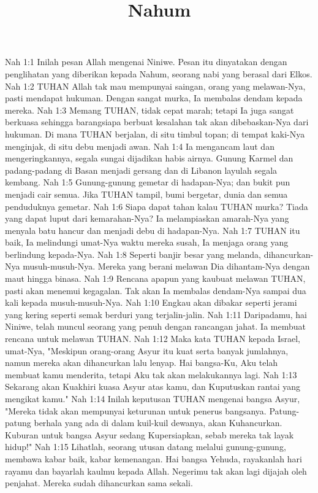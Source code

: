 

\title{Nahum}

Nah 1:1  Inilah pesan Allah mengenai Niniwe. Pesan itu dinyatakan dengan penglihatan yang diberikan kepada Nahum, seorang nabi yang berasal dari Elkos.
Nah 1:2  TUHAN Allah tak mau mempunyai saingan, orang yang melawan-Nya, pasti mendapat hukuman. Dengan sangat murka, Ia membalas dendam kepada mereka.
Nah 1:3  Memang TUHAN, tidak cepat marah; tetapi Ia juga sangat berkuasa sehingga barangsiapa berbuat kesalahan tak akan dibebaskan-Nya dari hukuman. Di mana TUHAN berjalan, di situ timbul topan; di tempat kaki-Nya menginjak, di situ debu menjadi awan.
Nah 1:4  Ia mengancam laut dan mengeringkannya, segala sungai dijadikan habis airnya. Gunung Karmel dan padang-padang di Basan menjadi gersang dan di Libanon layulah segala kembang.
Nah 1:5  Gunung-gunung gemetar di hadapan-Nya; dan bukit pun menjadi cair semua. Jika TUHAN tampil, bumi bergetar, dunia dan semua penduduknya gemetar.
Nah 1:6  Siapa dapat tahan kalau TUHAN murka? Tiada yang dapat luput dari kemarahan-Nya? Ia melampiaskan amarah-Nya yang menyala batu hancur dan menjadi debu di hadapan-Nya.
Nah 1:7  TUHAN itu baik, Ia melindungi umat-Nya waktu mereka susah, Ia menjaga orang yang berlindung kepada-Nya.
Nah 1:8  Seperti banjir besar yang melanda, dihancurkan-Nya musuh-musuh-Nya. Mereka yang berani melawan Dia dihantam-Nya dengan maut hingga binasa.
Nah 1:9  Rencana apapun yang kaubuat melawan TUHAN, pasti akan menemui kegagalan. Tak akan Ia membalas dendam-Nya sampai dua kali kepada musuh-musuh-Nya.
Nah 1:10  Engkau akan dibakar seperti jerami yang kering seperti semak berduri yang terjalin-jalin.
Nah 1:11  Daripadamu, hai Niniwe, telah muncul seorang yang penuh dengan rancangan jahat. Ia membuat rencana untuk melawan TUHAN.
Nah 1:12  Maka kata TUHAN kepada Israel, umat-Nya, "Meskipun orang-orang Asyur itu kuat serta banyak jumlahnya, namun mereka akan dihancurkan lalu lenyap. Hai bangsa-Ku, Aku telah membuat kamu menderita, tetapi Aku tak akan melakukannya lagi.
Nah 1:13  Sekarang akan Kuakhiri kuasa Asyur atas kamu, dan Kuputuskan rantai yang mengikat kamu."
Nah 1:14  Inilah keputusan TUHAN mengenai bangsa Asyur, "Mereka tidak akan mempunyai keturunan untuk penerus bangsanya. Patung-patung berhala yang ada di dalam kuil-kuil dewanya, akan Kuhancurkan. Kuburan untuk bangsa Asyur sedang Kupersiapkan, sebab mereka tak layak hidup!"
Nah 1:15  Lihatlah, seorang utusan datang melalui gunung-gunung, membawa kabar baik, kabar kemenangan. Hai bangsa Yehuda, rayakanlah hari rayamu dan bayarlah kaulmu kepada Allah. Negerimu tak akan lagi dijajah oleh penjahat. Mereka sudah dihancurkan sama sekali.
